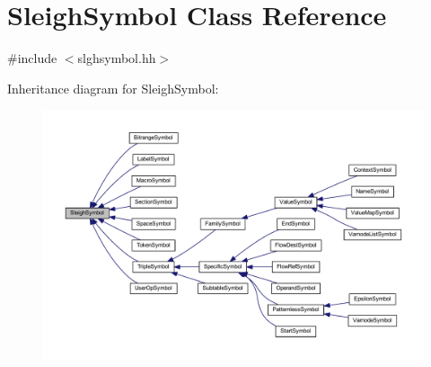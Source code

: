\hypertarget{class_sleigh_symbol}{}\section{Sleigh\+Symbol Class Reference}
\label{class_sleigh_symbol}


{\ttfamily \#include $<$slghsymbol.\+hh$>$}



Inheritance diagram for Sleigh\+Symbol\+:
\nopagebreak
\begin{figure}[H]
\begin{center}
\leavevmode
\includegraphics[width=350pt]{class_sleigh_symbol__inherit__graph}
\end{center}
\end{figure}
